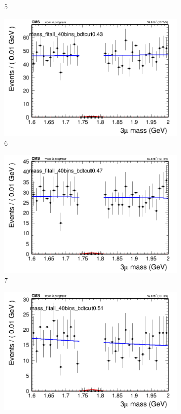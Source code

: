 \begin{figure}[h!]
\begin{subfigure}{0.2\textwidth}
        \caption{5}
    \end{subfigure}
    \begin{subfigure}{0.2\textwidth}
        \includegraphics[width=\textwidth]{power_law/plots/all/massfit_all_40bins_bdtcut0.43.png}
        \caption{6}
    \end{subfigure}
    \begin{subfigure}{0.2\textwidth}
        \includegraphics[width=\textwidth]{power_law/plots/all/massfit_all_40bins_bdtcut0.47.png}
        \caption{7}
    \end{subfigure}
    \begin{subfigure}{0.2\textwidth}
        \includegraphics[width=\textwidth]{power_law/plots/all/massfit_all_40bins_bdtcut0.51.png}

\end{subfigure}
\end{figure}
